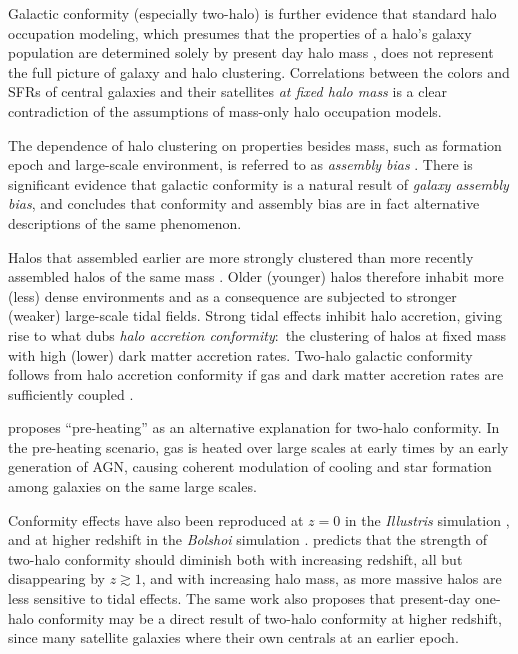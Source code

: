 Galactic conformity (especially two-halo) is further evidence that standard halo occupation modeling, which presumes that the properties of a halo's galaxy population are determined solely by present day halo mass , does not represent the full picture of galaxy and halo clustering.
Correlations between the colors and SFRs of central galaxies and their satellites \emph{at fixed halo mass} is a clear contradiction of the assumptions of mass-only halo occupation models.

The dependence of halo clustering on properties besides mass, such as formation epoch and large-scale environment, is referred to as \emph{assembly bias} .
There is significant evidence that galactic conformity is a natural result of \emph{galaxy assembly bias}, and \citet{Hearin15b} concludes that conformity and assembly bias are in fact alternative descriptions of the same phenomenon.

Halos that assembled earlier are more strongly clustered than more recently assembled halos of the same mass \citep{Hahn09?}.
Older (younger) halos therefore inhabit more (less) dense environments and as a consequence are subjected to stronger (weaker) large-scale tidal fields.
Strong tidal effects inhibit halo accretion, giving rise to what \citet{Hearin15b} dubs \emph{halo accretion conformity}:~the clustering of halos at fixed mass with high (lower) dark matter accretion rates.
Two-halo galactic conformity follows from halo accretion conformity if gas and dark matter accretion rates are sufficiently coupled .

\citet{Kauffmann15} proposes ``pre-heating'' as an alternative explanation for two-halo conformity.
In the pre-heating scenario, gas is heated over large scales at early times by an early generation of AGN, causing coherent modulation of cooling and star formation among galaxies on the same large scales.

Conformity effects have also been reproduced at $z=0$ in the \emph{Illustris} simulation \citep[see][]{Bray16}, and at higher redshift in the \emph{Bolshoi} simulation \citep{Klypin11, Hearin15a, Hearin15b}.
\citet{Hearin15b} predicts that the strength of two-halo conformity should diminish both with increasing redshift, all but disappearing by $z\gtrsim1$, and with increasing halo mass, as more massive halos are less sensitive to tidal effects.
The same work also proposes that present-day one-halo conformity may be a direct result of two-halo conformity at higher redshift, since many satellite galaxies where their own centrals at an earlier epoch.

